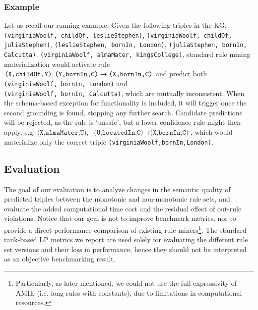 \documentclass[a4paper,UKenglish,cleveref, autoref, thm-restate]{tgdk-v2021}
\begin{document}
\subsubsection{Example} Let us recall our running example. Given the following triples in the KG: \texttt{(virginiaWoolf, childOf, leslieStephen)}, \texttt{(virginiaWoolf, childOf, juliaStephen)}, \texttt{(leslieStephen, bornIn, London)}, \texttt{(juliaStephen, bornIn, Calcutta)}, \texttt{(virginiaWoolf, almaMater, kingsCollege)}, standard rule mining materialization would activate rule $\texttt{(X,childOf,Y)}, \texttt{(Y,bornIn,C)} \rightarrow \\ \texttt{(X,bornIn,C)}$ and predict both \texttt{(virginiaWoolf, bornIn, London)} and\\ \texttt{(virginiaWoolf, bornIn, Calcutta)}, which are mutually inconsistent. When the schema-based exception for functionality is included, it will trigger once the second grounding is found, stopping any further search. Candidate predictions will be rejected, as the rule is `unsafe', but a lower confidence rule might then apply, e.g. $\texttt{(X,almaMater,U)}, $ $\texttt{(U,locatedIn,C)} \rightarrow \texttt{(X,bornIn,C)}$, which would materialize only the correct triple \texttt{(virginiaWoolf,bornIn,London)}. 
\subsection{Evaluation}


The goal of our evaluation is to analyze changes in the semantic quality of predicted triples between the monotonic and non-monotonic rule sets, and evaluate the added computational time cost and the residual effect of out-rule violations. Notice that our goal is not to improve benchmark metrics, nor to provide a direct performance comparison of existing rule miners\footnote{Particularly, as later mentioned, we could not use the full expressivity of AMIE (i.e. long rules with constants), due to limitations in computational resources.}. The standard rank-based LP metrics we report are used solely for evaluating the different rule set versions and their loss in performance, hence they should not be interpreted as an objective benchmarking result. 
\end{document}
